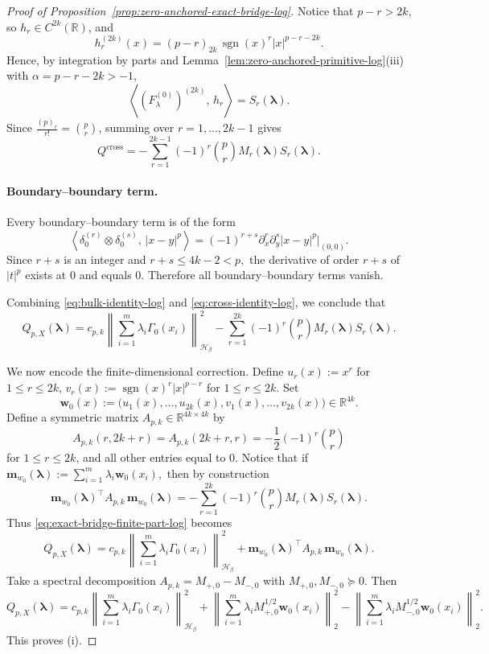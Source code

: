 \documentclass[11pt]{article}
\theoremstyle{definition}
\begin{document}
\begin{proof}[Proof of Proposition~\ref{prop:zero-anchored-exact-bridge-log}]
Notice that $p-r>2k$, so $h_r\in C^{2k}(\mathbb R)$, and
\[
h_r^{(2k)}(x)
=
(p-r)_{2k}\,\operatorname{sgn}(x)^r |x|^{p-r-2k}.
\]
Hence, by integration by parts and
Lemma~\ref{lem:zero-anchored-primitive-log}\textnormal{(iii)} with
$\alpha=p-r-2k>-1$,
\[
\left\langle (F_\lambda^{(0)})^{(2k)},\,h_r\right\rangle
=
S_r(\boldsymbol\lambda).
\]
Since $\frac{(p)_r}{r!}=\binom{p}{r}$, summing over $r=1,\dots,2k-1$ gives
\begin{equation}\label{eq:cross-identity-log}
Q^{\mathrm{cross}}
=
-\sum_{r=1}^{2k-1}(-1)^r\binom{p}{r}M_r(\boldsymbol\lambda)S_r(\boldsymbol\lambda).
\end{equation}

\paragraph{Boundary--boundary term.}
Every boundary--boundary term is of the form
\[
\left\langle \delta_0^{(r)}\otimes \delta_0^{(s)},\,|x-y|^p\right\rangle
=
(-1)^{r+s}\partial_x^r\partial_y^s |x-y|^p\big|_{(0,0)}.
\]
Since $r+s$ is an integer and
\(
r+s\le 4k-2<p,
\)
the derivative of order $r+s$ of $|t|^p$ exists at $0$ and equals $0$. Therefore all
boundary--boundary terms vanish.

Combining \eqref{eq:bulk-identity-log} and \eqref{eq:cross-identity-log}, we conclude that
\begin{equation}\label{eq:exact-bridge-finite-part-log}
Q_{p,X}(\boldsymbol\lambda)
=
c_{p,k}
\left\|\sum_{i=1}^m \lambda_i \Gamma_0(x_i)\right\|_{\mathcal H_\beta}^2
-
\sum_{r=1}^{2k}(-1)^r\binom{p}{r}M_r(\boldsymbol\lambda)S_r(\boldsymbol\lambda).
\end{equation}

We now encode the finite-dimensional correction. Define
\(
u_r(x):=x^r
\)
for \(1\le r\le 2k\),
\(
v_r(x):=\operatorname{sgn}(x)^r |x|^{p-r}\)
for \(1\le r\le 2k.\)
Set
\[
\boldsymbol{w}_0(x):=
\bigl(
u_1(x),\dots,u_{2k}(x),v_1(x),\dots,v_{2k}(x)
\bigr)\in\mathbb R^{4k}.
\]
Define a symmetric matrix $A_{p,k}\in\mathbb R^{4k\times 4k}$ by
\[
A_{p,k}(r,2k+r)=A_{p,k}(2k+r,r)
=
-\frac12(-1)^r\binom{p}{r}
\]
for \(1\le r\le 2k\),
and all other entries equal to $0$. Notice that if
\(
\mathbf m_{w_0}(\boldsymbol\lambda):=\sum_{i=1}^m \lambda_i \boldsymbol w_0(x_i),
\)
then by construction
\[
\mathbf m_{w_0}(\boldsymbol\lambda)^\top A_{p,k}\,\mathbf m_{w_0}(\boldsymbol\lambda)
=
-
\sum_{r=1}^{2k}(-1)^r\binom{p}{r}M_r(\boldsymbol\lambda)S_r(\boldsymbol\lambda).
\]
Thus \eqref{eq:exact-bridge-finite-part-log} becomes
\[
Q_{p,X}(\boldsymbol\lambda)
=
c_{p,k}
\left\|\sum_{i=1}^m \lambda_i \Gamma_0(x_i)\right\|_{\mathcal H_\beta}^2
+
\mathbf m_{w_0}(\boldsymbol\lambda)^\top A_{p,k}\,\mathbf m_{w_0}(\boldsymbol\lambda).
\]
Take a spectral decomposition
\(
A_{p,k}=M_{+,0}-M_{-,0}
\)
with \(
M_{+,0},M_{-,0}\succeq 0.
\)
Then
\[
Q_{p,X}(\boldsymbol\lambda)
=
c_{p,k}
\left\|\sum_{i=1}^m \lambda_i \Gamma_0(x_i)\right\|_{\mathcal H_\beta}^2 +
\left\|\sum_{i=1}^m \lambda_i M_{+,0}^{1/2}\boldsymbol w_0(x_i)\right\|_2^2
-
\left\|\sum_{i=1}^m \lambda_i M_{-,0}^{1/2}\boldsymbol w_0(x_i)\right\|_2^2.
\]
This proves \textnormal{(i)}.



\end{proof}
\end{document}
